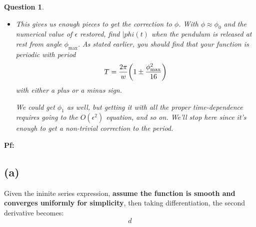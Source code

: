\documentclass{article}
\newtheorem{question}{Question}
\DeclarePairedDelimiter{\paran}{(}{)}%
\begin{document}
\begin{question}
\begin{itemize}
        \item[(f)] This gives us enough pieces to get the correction to $\phi$. With $\phi\approx \phi_0$ and the numerical value of $\epsilon$ restored, find $|phi(t)$ when the pendulum is released at rest from angle $\phi_{\max}$. As stated earlier, you should find that your function is periodic with period 
        $$T=\frac{2\pi}{w}\paran*{1\pm\frac{\phi^2_{\max}}{16}}$$
        with either a plus or a minus sign.

        We could get $\phi_1$ as well, but getting it with all the proper time-dependence requires going to the $O(\epsilon^2)$ equation, and so on. We'll stop here since it's enough to get a non-trivial correction to the period.
    \end{itemize}
\end{question}

\textbf{Pf:}
\subsection*{(a)}
Given the ininite series expression, \textbf{assume the function is smooth and converges uniformly for simplicity}, then taking differentiation, the second derivative becomes:
\begin{equation}
    d
\end{equation}

\break
\end{document}
